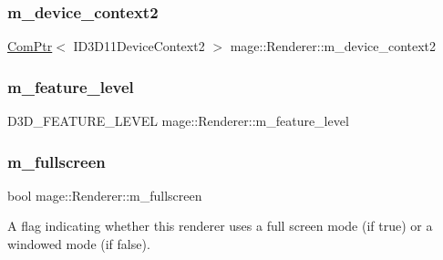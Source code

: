\hypertarget{classmage_1_1_renderer_ab8d5eba948922f5ce1116b067e60bee7}{}\label{classmage_1_1_renderer_ab8d5eba948922f5ce1116b067e60bee7} 
\subsubsection{\texorpdfstring{m\+\_\+device\+\_\+context2}{m\_device\_context2}}
{\footnotesize\ttfamily \hyperlink{namespacemage_ae74f374780900893caa5555d1031fd79}{Com\+Ptr}$<$ I\+D3\+D11\+Device\+Context2 $>$ mage\+::\+Renderer\+::m\+\_\+device\+\_\+context2\hspace{0.3cm}{\ttfamily [protected]}}

\hypertarget{classmage_1_1_renderer_aa97b108ef58f7d41ddb527f6ba2bfdf9}{}\label{classmage_1_1_renderer_aa97b108ef58f7d41ddb527f6ba2bfdf9} 
\subsubsection{\texorpdfstring{m\+\_\+feature\+\_\+level}{m\_feature\_level}}
{\footnotesize\ttfamily D3\+D\+\_\+\+F\+E\+A\+T\+U\+R\+E\+\_\+\+L\+E\+V\+EL mage\+::\+Renderer\+::m\+\_\+feature\+\_\+level\hspace{0.3cm}{\ttfamily [protected]}}

\hypertarget{classmage_1_1_renderer_a72bb88b17491bd388460afae9d207b0a}{}\label{classmage_1_1_renderer_a72bb88b17491bd388460afae9d207b0a} 
\subsubsection{\texorpdfstring{m\+\_\+fullscreen}{m\_fullscreen}}
{\footnotesize\ttfamily bool mage\+::\+Renderer\+::m\+\_\+fullscreen\hspace{0.3cm}{\ttfamily [private]}}

A flag indicating whether this renderer uses a full screen mode (if {\ttfamily true}) or a windowed mode (if {\ttfamily false}). \hypertarget{classmage_1_1_renderer_afc314c8b146c3709edfd5349257a8387}{}\label{classmage_1_1_renderer_afc314c8b146c3709edfd5349257a8387} 
